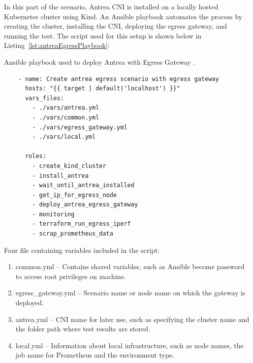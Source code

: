 
In this part of the scenario, Antrea CNI is installed on a locally hosted Kubernetes cluster using Kind. An Ansible playbook automates the process by creating the cluster, installing the CNI, deploying the egress gateway, and running the test. The script used for this setup is shown below in Listing~\ref{lst:antreaEgressPlaybook}:

\begin{listing}[H]
  \centering
  \caption{Ansible playbook used to deploy Antrea with Egress Gateway \cite{AnsibleDocs}.}
  \begin{verbatim}
    - name: Create antrea egress scenario with egress gateway
      hosts: "{{ target | default('localhost') }}"
      vars_files:
        - ./vars/antrea.yml
        - ./vars/common.yml
        - ./vars/egress_gateway.yml
        - ./vars/local.yml

      roles:
        - create_kind_cluster
        - install_antrea
        - wait_until_antrea_installed
        - get_ip_for_egress_node
        - deploy_antrea_egress_gateway
        - monitoring
        - terraform_run_egress_iperf
        - scrap_prometheus_data
  \end{verbatim}
  \label{lst:antreaEgressPlaybook}
\end{listing}

Four file containing variables included in the script:
\begin{enumerate}
  \item common.yml -- Contains shared variables, such as Ansible become password to access root privileges on machine.
  \item egress\_gateway.yml -- Scenario name or node name on which the gateway is deployed.
  \item antrea.yml -- CNI name for later use, such as specifying the cluster name and the folder path where test results are stored.
  \item local.yml -- Information about local infrastructure, such as node names, the job name for Prometheus and the environment type.
\end{enumerate}

